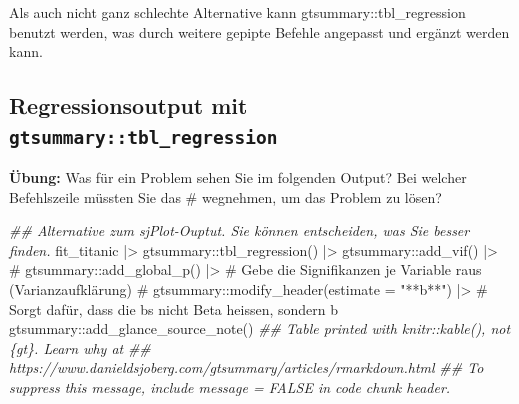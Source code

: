 \documentclass[
  10pt,
  letterpaper,
  a4paper, twoside]{scrreprt}
\newenvironment{Shaded}{\begin{snugshade}}{\end{snugshade}}
\newcommand{\CommentTok}[1]{\textcolor[rgb]{0.37,0.37,0.37}{#1}}
\newcommand{\DocumentationTok}[1]{\textcolor[rgb]{0.37,0.37,0.37}{\textit{#1}}}
\newcommand{\FunctionTok}[1]{\textcolor[rgb]{0.28,0.35,0.67}{#1}}
\newcommand{\NormalTok}[1]{\textcolor[rgb]{0.00,0.23,0.31}{#1}}
\newcommand{\SpecialCharTok}[1]{\textcolor[rgb]{0.37,0.37,0.37}{#1}}
\begin{document}
Als auch nicht ganz schlechte Alternative kann
gtsummary::tbl\_regression benutzt werden, was durch weitere gepipte
Befehle angepasst und ergänzt werden kann.

\subsection*{\texorpdfstring{Regressionsoutput mit
\texttt{gtsummary::tbl\_regression}}{Regressionsoutput mit gtsummary::tbl\_regression}}\label{regressionsoutput-mit-gtsummarytbl_regression}

\textbf{Übung:} Was für ein Problem sehen Sie im folgenden Output? Bei
welcher Befehlszeile müssten Sie das \# wegnehmen, um das Problem zu
lösen?

\begin{Shaded}
\begin{Highlighting}[]
\DocumentationTok{\#\# Alternative zum sjPlot{-}Ouptut. Sie können entscheiden, was Sie besser finden. }
\NormalTok{fit\_titanic }\SpecialCharTok{|\textgreater{}} 
\NormalTok{  gtsummary}\SpecialCharTok{::}\FunctionTok{tbl\_regression}\NormalTok{() }\SpecialCharTok{|\textgreater{}} 
\NormalTok{  gtsummary}\SpecialCharTok{::}\FunctionTok{add\_vif}\NormalTok{() }\SpecialCharTok{|\textgreater{}} 
\CommentTok{\#  gtsummary::add\_global\_p() |\textgreater{} \# Gebe die Signifikanzen je Variable raus (Varianzaufklärung)}
\CommentTok{\#  gtsummary::modify\_header(estimate = "**b**")   |\textgreater{} \# Sorgt dafür, dass die b\textquotesingle{}s nicht Beta heissen, sondern b}
\NormalTok{  gtsummary}\SpecialCharTok{::}\FunctionTok{add\_glance\_source\_note}\NormalTok{()}
\DocumentationTok{\#\# Table printed with \textasciigrave{}knitr::kable()\textasciigrave{}, not \{gt\}. Learn why at}
\DocumentationTok{\#\# https://www.danieldsjoberg.com/gtsummary/articles/rmarkdown.html}
\DocumentationTok{\#\# To suppress this message, include \textasciigrave{}message = FALSE\textasciigrave{} in code chunk header.}
\end{Highlighting}
\end{Shaded}
\end{document}
